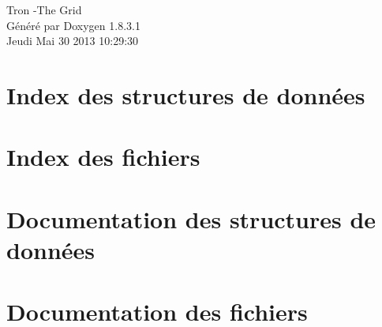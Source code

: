 \documentclass{book}
\begin{document}
\hypersetup{pageanchor=false,citecolor=blue}
\begin{titlepage}
\vspace*{7cm}
\begin{center}
{\Large Tron -\/\-The Grid }\\
\vspace*{1cm}
{\large Généré par Doxygen 1.8.3.1}\\
\vspace*{0.5cm}
{\small Jeudi Mai 30 2013 10:29:30}\\
\end{center}
\end{titlepage}
\clearemptydoublepage
{}
\tableofcontents
\clearemptydoublepage
{}
\hypersetup{pageanchor=true,citecolor=blue}
\chapter{Index des structures de données}

\chapter{Index des fichiers}

\chapter{Documentation des structures de données}












\chapter{Documentation des fichiers}




























\printindex
\end{document}
